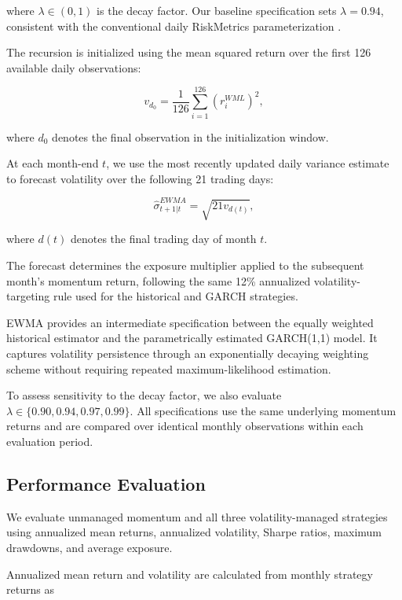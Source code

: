 \documentclass[11pt]{article}
\begin{document}
where $\lambda \in (0,1)$ is the decay factor. Our baseline
specification sets $\lambda = 0.94$, consistent with the
conventional daily RiskMetrics parameterization \citep{riskmetrics1996technical}.

The recursion is initialized using the mean squared return
over the first 126 available daily observations:

\begin{equation}
    v_{d_0} =
    \frac{1}{126}
    \sum_{i=1}^{126}(r_i^{WML})^2,
\end{equation}

where $d_0$ denotes the final observation in the
initialization window.

At each month-end $t$, we use the most recently updated
daily variance estimate to forecast volatility over the
following 21 trading days:

\begin{equation}
    \widehat{\sigma}^{EWMA}_{t+1|t}
    = \sqrt{21v_{d(t)}},
\end{equation}

where $d(t)$ denotes the final trading day of month $t$.

The forecast determines the exposure multiplier applied
to the subsequent month's momentum return, following
the same 12\% annualized volatility-targeting rule used
for the historical and GARCH strategies.

EWMA provides an intermediate specification between
the equally weighted historical estimator and the
parametrically estimated GARCH(1,1) model. It captures
volatility persistence through an exponentially decaying
weighting scheme without requiring repeated
maximum-likelihood estimation.

To assess sensitivity to the decay factor, we also
evaluate $\lambda \in \{0.90, 0.94, 0.97, 0.99\}$.
All specifications use the same underlying momentum
returns and are compared over identical monthly
observations within each evaluation period.

\subsection{Performance Evaluation}

We evaluate unmanaged momentum and all three
volatility-managed strategies using annualized
mean returns, annualized volatility, Sharpe
ratios, maximum drawdowns, and average exposure.

Annualized mean return and volatility are
calculated from monthly strategy returns as
\end{document}
